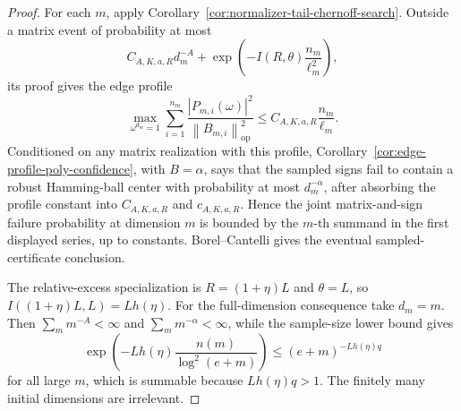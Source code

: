 \documentclass[11pt]{amsart}
\numberwithin{equation}{section}
\theoremstyle{definition}
\theoremstyle{remark}
\newcommand{\op}{\mathrm{op}}
\newcommand{\norm}[1]{\left\lVert #1\right\rVert}
\newcommand{\abs}[1]{\left\lvert #1\right\rvert}
\begin{document}
\begin{proof}
For each \(m\), apply
Corollary~\ref{cor:normalizer-tail-chernoff-search}.  Outside a matrix event of
probability at most
\[
  C_{A,K,a,R}d_m^{-A}
  +\exp\left(-I(R,\theta)\frac{n_m}{\ell_m^2}\right),
\]
its proof gives the edge profile
\[
  \max_{\omega^{d_m}=1}\sum_{i=1}^{n_m}
  \frac{\abs{P_{m,i}(\omega)}^2}{\norm{B_{m,i}}_{\op}^2}
  \le C_{A,K,a,R}\frac{n_m}{\ell_m}.
\]
Conditioned on any matrix realization with this profile,
Corollary~\ref{cor:edge-profile-poly-confidence}, with \(B=\alpha\), says that
the sampled signs fail to contain a robust Hamming-ball center with probability
at most \(d_m^{-\alpha}\), after absorbing the profile constant into
\(C_{A,K,a,R}\) and \(c_{A,K,a,R}\).  Hence the joint matrix-and-sign failure
probability at dimension \(m\) is bounded by the \(m\)-th summand in the first
displayed series, up to constants.  Borel--Cantelli gives the eventual
sampled-certificate conclusion.

The relative-excess specialization is \(R=(1+\eta)L\) and \(\theta=L\), so
\(I((1+\eta)L,L)=Lh(\eta)\).  For the full-dimension consequence take
\(d_m=m\).  Then \(\sum_m m^{-A}<\infty\) and
\(\sum_m m^{-\alpha}<\infty\), while the sample-size lower bound gives
\[
  \exp\left(-Lh(\eta)\frac{n(m)}{\log^2(e+m)}\right)
  \le (e+m)^{-Lh(\eta)q}
\]
for all large \(m\), which is summable because \(Lh(\eta)q>1\).  The finitely
many initial dimensions are irrelevant.
\end{proof}
\end{document}
